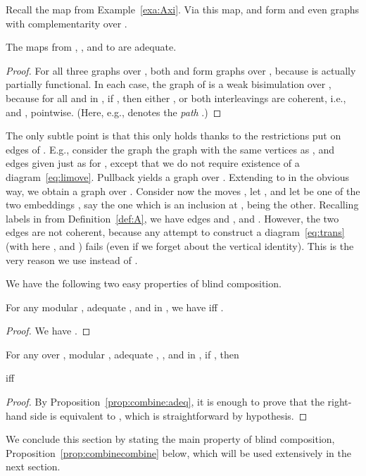 \documentclass{LMCS}
\theoremstyle{plain}\newtheorem{satz}[thm]{Satz}
\begin{document}
Recall the map  from Example~\ref{exa:Axi}.
Via this map,  and  form \ltss{} and even graphs with
complementarity over .
\begin{prop}
  The maps from , , and  to  are adequate.
\end{prop}
\begin{proof}
  For all three graphs  over , both  and
   form graphs over , because  is actually partially functional.  In each case,
  the graph of  is a weak
  bisimulation over , because for all  and  in , if
  , then either , or both interleavings
  are coherent, i.e.,  and , pointwise. (Here, e.g.,  denotes the \emph{path}
  .)
\end{proof}
The only subtle point is that this only holds thanks to the
restrictions put on edges of . E.g., consider the graph the
graph  with the same vertices as , and edges  given just as for , except that we
do not require existence of a diagram~\eqref{eq:limove}.  Pullback
yields a graph  over .  Extending  to  in the obvious way, we obtain a graph over
.  Consider now the moves , let , and let  be one of the two
embeddings , say the one which is an inclusion at ,
 being the other.  Recalling labels in  from
Definition~\ref{def:A}, we have edges  and , and . However, the two edges are not coherent, because any attempt
to construct a diagram~\eqref{eq:trans} (with here ,
and ) fails (even if we forget about the vertical
identity). This is the very reason we use  instead of
.

We have the following two easy properties of blind composition.
\begin{prop}\label{prop:combine:adeq}
  For any modular , adequate , and  in , we have 
   iff .
\end{prop}
\begin{proof}
We have  .
\end{proof}

\begin{prop}
  For any  over , modular , adequate , , and
   in , if , then
  \begin{center}
     iff 
  \end{center}
\end{prop}
\begin{proof}
  By Proposition~\ref{prop:combine:adeq}, it is enough to prove that
  the right-hand side is equivalent to , which is straightforward by hypothesis.
\end{proof}



We conclude this section by stating the main property of blind
composition, Proposition~\ref{prop:combinecombine} below, which will
be used extensively in the next section.
\end{document}

